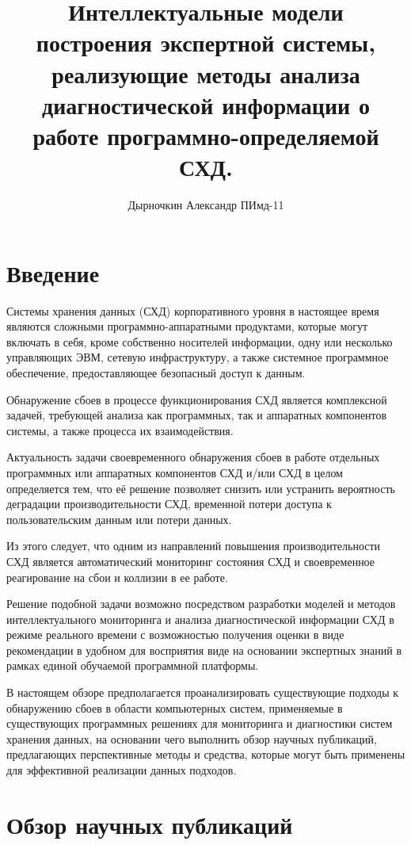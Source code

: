 \documentclass[12pt,a4paper]{article}
\title{Интеллектуальные модели построения экспертной системы, реализующие методы анализа диагностической информации о работе программно-определяемой СХД.}
\author{Дырночкин Александр ПИмд-11}
\date{}
\begin{document}
\maketitle

\section*{Введение}

Системы хранения данных (СХД) корпоративного уровня в настоящее время являются сложными программно-аппаратными продуктами, которые могут включать в себя, кроме собственно носителей информации, одну или несколько управляющих ЭВМ, сетевую инфраструктуру, а также системное программное обеспечение, предоставляющее безопасный доступ к данным.

Обнаружение сбоев в процессе функционирования СХД является комплексной задачей, требующей анализа как программных, так и аппаратных компонентов системы, а также процесса их взаимодействия.

Актуальность задачи своевременного обнаружения сбоев в работе отдельных программных или аппаратных компонентов СХД и/или СХД в целом определяется тем, что её решение позволяет снизить или устранить вероятность деградации производительности СХД, временной потери доступа к пользовательским данным или потери данных.

Из этого следует, что одним из направлений повышения производительности СХД является автоматический мониторинг состояния СХД и своевременное реагирование на сбои и коллизии в ее работе.

Решение подобной задачи возможно посредством разработки моделей и методов интеллектуального мониторинга и анализа диагностической информации СХД в режиме реального времени с возможностью получения оценки в виде рекомендации в удобном для восприятия виде на основании экспертных знаний в рамках единой обучаемой программной платформы.

В настоящем обзоре предполагается проанализировать существующие подходы к обнаружению сбоев в области компьютерных систем, применяемые в существующих программных решениях для мониторинга и диагностики систем хранения данных, на основании чего выполнить обзор научных публикаций, предлагающих перспективные методы и средства, которые могут быть применены для эффективной реализации данных подходов.

\section*{Обзор научных публикаций}
\end{document}
